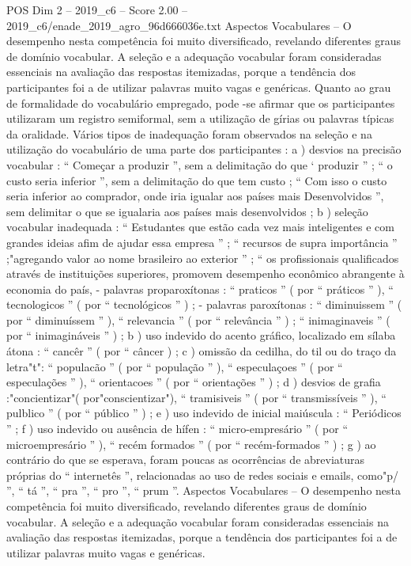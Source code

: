 \begin{textsample}{POS Dim 2 – 2019\_c6 – Score 2.00 – 2019\_c6/enade\_2019\_agro\_96d666036e.txt}
Aspectos Vocabulares – O desempenho nesta competência foi muito diversificado, revelando diferentes graus de domínio vocabular.
A seleção e a adequação vocabular foram consideradas essenciais na avaliação das respostas itemizadas, porque a tendência dos participantes foi a de utilizar palavras muito vagas e genéricas.
Quanto ao grau de formalidade do vocabulário empregado, pode -se afirmar que os participantes utilizaram um registro semiformal, sem a utilização de gírias ou palavras típicas da oralidade.
Vários tipos de inadequação foram observados na seleção e na utilização do vocabulário de uma parte dos participantes : a ) desvios na precisão vocabular : “ Começar a produzir ”, sem a delimitação do que ‘ produzir ” ; “ o custo seria inferior ”, sem a delimitação do que tem custo ; “ Com isso o custo seria inferior ao comprador, onde iria igualar aos países mais Desenvolvidos ”, sem delimitar o que se igualaria aos países mais desenvolvidos ; b ) seleção vocabular inadequada : “ Estudantes que estão cada vez mais inteligentes e com grandes ideias afim de ajudar essa empresa ” ; “ recursos de supra importância ” ;"agregando valor ao nome brasileiro ao exterior ” ; “ os profissionais qualificados através de instituições superiores, promovem desempenho econômico abrangente à economia do país, - palavras proparoxítonas : “ praticos ” ( por “ práticos ” ), “ tecnologicos ” ( por “ tecnológicos ” ) ; - palavras paroxítonas : “ diminuissem ” ( por “ diminuíssem ” ), “ relevancia ” ( por “ relevância ” ) ; “ inimaginaveis ” ( por “ inimagináveis ” ) ; b ) uso indevido do acento gráfico, localizado em sílaba átona : “ cancêr ” ( por “ câncer ) ; c ) omissão da cedilha, do til ou do traço da letra"t": “ populacão ” ( por “ população ” ), “ especulaçoes ” ( por “ especulações ” ), “ orientacoes ” ( por “ orientações ” ) ; d ) desvios de grafia :"concientizar"( por"conscientizar"), “ tramisiveis ” ( por “ transmissíveis ” ), “ pulblico ” ( por “ público ” ) ; e ) uso indevido de inicial maiúscula : “ Periódicos ” ; f ) uso indevido ou ausência de hífen : “ micro-empresário ” ( por “ microempresário ” ), “ recém formados ” ( por “ recém-formados ” ) ; g ) ao contrário do que se esperava, foram poucas as ocorrências de abreviaturas próprias do “ internetês ”, relacionadas ao uso de redes sociais e emails, como"p/ ”, “ tá ”, “ pra ”, “ pro ”, “ prum ”.
Aspectos Vocabulares – O desempenho nesta competência foi muito diversificado, revelando diferentes graus de domínio vocabular.
A seleção e a adequação vocabular foram consideradas essenciais na avaliação das respostas itemizadas, porque a tendência dos participantes foi a de utilizar palavras muito vagas e genéricas.

\end{textsample}

